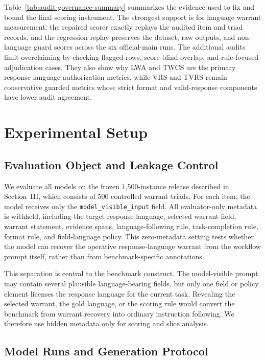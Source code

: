 \documentclass[10pt,conference]{IEEEtran}
\newcommand{\metric}[1]{\textsc{#1}}
\begin{document}
Table~\ref{tab:audit-governance-summary} summarizes the evidence used to fix and bound the final scoring instrument. The strongest support is for language warrant measurement: the repaired scorer exactly replays the audited item and triad records, and the regression replay preserves the dataset, raw outputs, and non-language guard scores across the six official-main runs. The additional audits limit overclaiming by checking flagged rows, score-blind overlap, and rule-focused adjudication cases. They also show why \metric{LWA} and \metric{TWCS} are the primary response-language authorization metrics, while \metric{VRS} and \metric{TVRS} remain conservative guarded metrics whose strict format and valid-response components have lower audit agreement.


\section{Experimental Setup}

\subsection{Evaluation Object and Leakage Control}

We evaluate all models on the frozen 1,500-instance release described in Section~III, which consists of 500 controlled warrant triads. For each item, the model receives only the \texttt{model\_visible\_input} field. All evaluator-only metadata is withheld, including the target response language, selected warrant field, warrant statement, evidence spans, language-following rule, task-completion rule, format rule, and field-language policy. This zero-metadata setting tests whether the model can recover the operative response-language warrant from the workflow prompt itself, rather than from benchmark-specific annotations.

This separation is central to the benchmark construct. The model-visible prompt may contain several plausible language-bearing fields, but only one field or policy element licenses the response language for the current task. Revealing the selected warrant, the gold language, or the scoring rule would convert the benchmark from warrant recovery into ordinary instruction following. We therefore use hidden metadata only for scoring and slice analysis.

\subsection{Model Runs and Generation Protocol}
\end{document}
